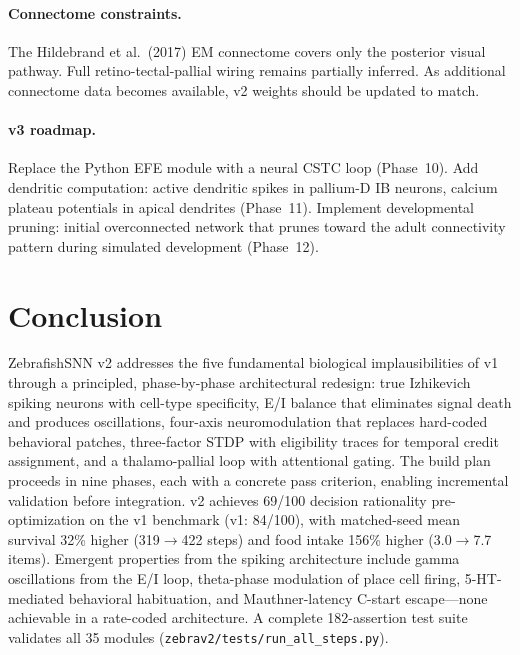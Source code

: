 \documentclass[11pt,a4paper]{article}
\begin{document}
\paragraph{Connectome constraints.}
The Hildebrand et al.\ (2017) EM connectome covers only the posterior
visual pathway. Full retino-tectal-pallial wiring remains partially inferred.
As additional connectome data becomes available, v2 weights should be
updated to match.

\paragraph{v3 roadmap.}
Replace the Python EFE module with a neural CSTC loop (Phase~10).
Add dendritic computation: active dendritic spikes in pallium-D IB neurons,
calcium plateau potentials in apical dendrites (Phase~11).
Implement developmental pruning: initial overconnected network that prunes
toward the adult connectivity pattern during simulated development (Phase~12).

\section{Conclusion}

ZebrafishSNN v2 addresses the five fundamental biological implausibilities
of v1 through a principled, phase-by-phase architectural redesign:
true Izhikevich spiking neurons with cell-type specificity,
E/I balance that eliminates signal death and produces oscillations,
four-axis neuromodulation that replaces hard-coded behavioral patches,
three-factor STDP with eligibility traces for temporal credit assignment,
and a thalamo-pallial loop with attentional gating.
The build plan proceeds in nine phases, each with a concrete pass criterion,
enabling incremental validation before integration.
v2 achieves 69/100 decision rationality pre-optimization on the v1 benchmark
(v1: 84/100), with matched-seed mean survival 32\% higher (319$\to$422 steps)
and food intake 156\% higher (3.0$\to$7.7 items).
Emergent properties from the spiking architecture include gamma oscillations
from the E/I loop, theta-phase modulation of place cell firing,
5-HT-mediated behavioral habituation, and Mauthner-latency C-start escape---none
achievable in a rate-coded architecture.
A complete 182-assertion test suite validates all 35 modules
(\texttt{zebrav2/tests/run\_all\_steps.py}).

\end{document}
